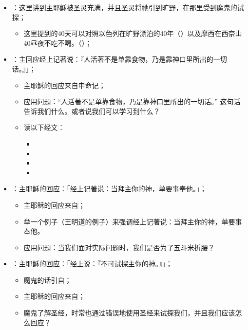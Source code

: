 \begin{itemize}
  \item {}：这里讲到主耶稣被圣灵充满，并且圣灵将祂引到旷野，在那里受到魔鬼的试探；
  \begin{itemize}
    \item 这里提到的40天可以对照以色列在旷野漂泊的40年（）以及摩西在西奈山40昼夜不吃不喝。（）；
  \end{itemize}
  \item {}：主回应经上记著说：『人活著不是单靠食物，乃是靠神口里所出的一切话。』」；
  \begin{itemize}
    \item 主耶稣的回应来自申命记；
    \item 应用问题：“人活著不是单靠食物，乃是靠神口里所出的一切话。” 这句话告诉我们什么。或者说我们可以学习到什么？ 
    \item 读以下经文：
    \begin{itemize}
      \item {}
      \item {}
      \item {}
      \item {}
    \end{itemize}
  \end{itemize}
  \item {}：主耶稣的回应：「经上记著说：当拜主你的神，单要事奉他。」；
  \begin{itemize}
    \item 主耶稣的回应来自；
    \item 举一个例子（王明道的例子）来强调经上记著说：当拜主你的神，单要事奉他。
    \item 应用问题：当我们面对实际问题时，我们是否为了五斗米折腰？
  \end{itemize}
  \item {}：主耶稣的回应：「经上说：『不可试探主你的神。』」；
  \begin{itemize}
    \item 魔鬼的话引自；
    \item 主耶稣的回应来自；
    \item 魔鬼了解圣经，时常也通过错误地使用圣经来试探我们，并且我们应该怎么回应？
  \end{itemize}
\end{itemize}

